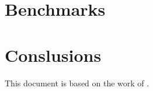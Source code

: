\documentclass{article}
\begin{document}
\bigbreak

\section{Benchmarks}

\section{Conslusions}

This document is based on the work of \cite{semaphorev1whitepaper}.

\sloppy

\printbibliography

\end{document}

